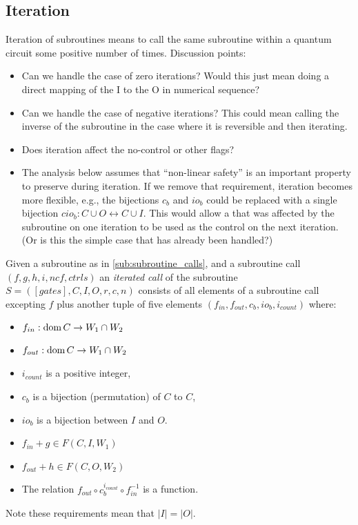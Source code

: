 \subsection{Iteration} %
\label{sub:iteration}
Iteration of subroutines means to call the same subroutine within a quantum circuit some positive
number of times. Discussion points:
\begin{itemize}
  \item Can we handle the case of zero iterations? Would this just mean doing a direct mapping of
  the I to the O in numerical sequence?
  \item Can we handle the case of negative iterations? This could mean calling the inverse of the
  subroutine in the case where it is reversible and then iterating.
  \item Does iteration affect the no-control or other flags?
  \item The analysis below assumes that ``non-linear safety'' is an important property to preserve
  during iteration. If we remove that requirement, iteration becomes more flexible, e.g., the
  bijections $c_b$ and $io_b$ could be replaced with a single bijection $cio_b : C\cup O
  \leftrightarrow C\cup I$. This would allow a \qubit that was affected by the subroutine on one
  iteration to be used as the control on the next iteration. (Or is this the simple case that has
  already been handled?)
\end{itemize}
\begin{definition}\label{def:iterated_subroutine_call}
  Given a subroutine as in \vref{sub:subroutine_calls}, and a subroutine call $(f,g,h,i,ncf,ctrls)$
  an \emph{iterated call} of the subroutine $S = ([gates],C,I,O,r,c,n)$ consists of all elements of
  a subroutine call excepting $f$ plus another tuple of five elements
  $(f_{in},f_{out},c_b,io_b,i_{count})$ where:
  \begin{itemize}
    \item $f_{in}:\operatorname*{dom} C \to W_1\cap W_2$
    \item $f_{out}:\operatorname*{dom} C \to W_1\cap W_2$
    \item $i_{count}$ is a positive integer,
    \item $c_b$ is a bijection (permutation) of $C$ to $C$,
    \item $io_b$ is a bijection between $I$ and $O$.
    \item $f_{in}+ g \in F(C,I,W_1)$
    \item $f_{out}+ h \in F(C,O,W_2)$
    \item The relation $f_{out} \circ c_b^{i_{count}} \circ f_{in}^{-1}$
    is a function.
  \end{itemize}
  Note these requirements mean that $|I| = |O|$.
\end{definition}

